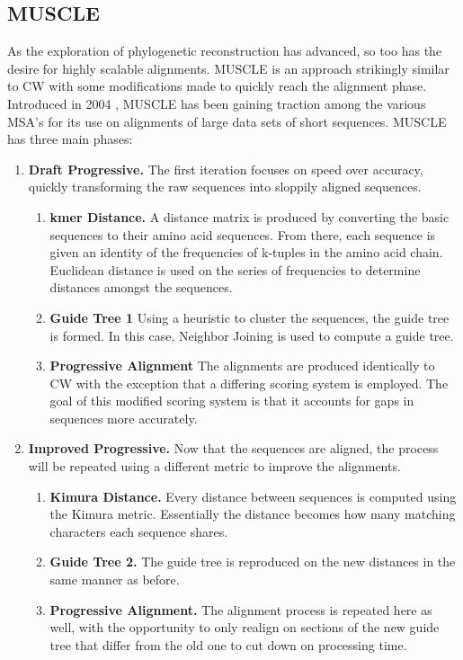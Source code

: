 \documentclass[10pt,twocolumn]{article}
\begin{document}
\subsection*{MUSCLE}
As the exploration of phylogenetic reconstruction has advanced, so too has the desire for highly scalable alignments. MUSCLE is an approach strikingly similar to CW with some modifications made to quickly reach the alignment phase. Introduced in 2004 \cite{edgar2004muscle}, MUSCLE has been gaining traction among the various MSA's for its use on alignments of large data sets of short sequences. MUSCLE has three main phases:
\begin{enumerate}
  \item \textbf{Draft Progressive.} The first iteration focuses on speed over accuracy, quickly transforming the raw sequences into sloppily aligned sequences.
  \begin{enumerate}
  	\item \textbf{kmer Distance.} A distance matrix is produced by converting the basic sequences to their amino acid sequences. From there, each sequence is given an identity of the frequencies of k-tuples in the amino acid chain. Euclidean distance is used on the series of frequencies to determine distances amongst the sequences.
  	\item \textbf{Guide Tree 1} Using a heuristic to cluster the sequences, the guide tree is formed. In this case, Neighbor Joining is used to compute a guide tree.
  	\item \textbf{Progressive Alignment} The alignments are produced identically to CW with the exception that a differing scoring system \cite{edgar2004comparison} is employed. The goal of this modified scoring system is that it accounts for gaps in sequences more accurately.
\end{enumerate}
  \item \textbf{Improved Progressive.} Now that the sequences are aligned, the process will be repeated using a different metric to improve the alignments.
    \begin{enumerate}
  	\item \textbf{Kimura Distance.} Every distance between sequences is computed using the Kimura metric. Essentially the distance becomes how many matching characters each sequence shares.
  	\item \textbf{Guide Tree 2.} The guide tree is reproduced on the new distances in the same manner as before.
  	\item \textbf{Progressive Alignment.} The alignment process is repeated here as well, with the opportunity to only realign on sections of the new guide tree that differ from the old one to cut down on processing time.

\end{enumerate}
\end{enumerate}
\end{document}
